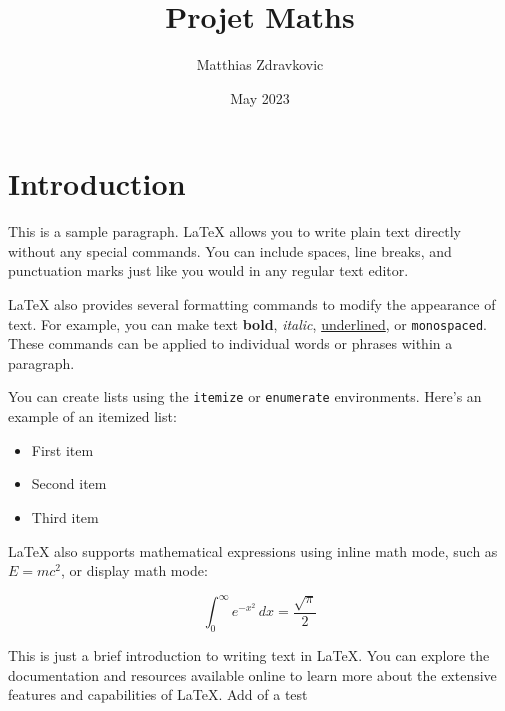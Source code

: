 \documentclass{article}
\title{Projet Maths}
\author{Matthias Zdravkovic}
\date{May 2023}
\begin{document}
\maketitle

\section{Introduction}

This is a sample paragraph. LaTeX allows you to write plain text directly without any special commands. You can include spaces, line breaks, and punctuation marks just like you would in any regular text editor.

LaTeX also provides several formatting commands to modify the appearance of text. For example, you can make text \textbf{bold}, \textit{italic}, \underline{underlined}, or \texttt{monospaced}. These commands can be applied to individual words or phrases within a paragraph.

You can create lists using the \texttt{itemize} or \texttt{enumerate} environments. Here's an example of an itemized list:

\begin{itemize}
    \item First item
    \item Second item
    \item Third item
\end{itemize}

LaTeX also supports mathematical expressions using inline math mode, such as $E = mc^2$, or display math mode:

\[
\int_{0}^{\infty} e^{-x^2} \, dx = \frac{\sqrt{\pi}}{2}
\]

This is just a brief introduction to writing text in LaTeX. You can explore the documentation and resources available online to learn more about the extensive features and capabilities of LaTeX.
Add of a test
\end{document}
